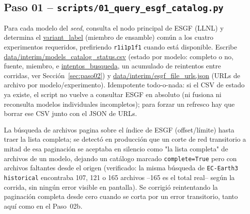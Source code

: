\documentclass[11pt,a4paper]{article}
\newcommand{\archivo}[1]{\begingroup\hypersetup{urlcolor=black}\url{#1}\endgroup}
\begin{document}
\subsection{Paso 01 -- \texttt{scripts/01\_query\_esgf\_catalog.py}}
\label{sec:paso01}
Para cada modelo del \emph{seed}, consulta el nodo principal de ESGF (LLNL) y determina el \archivo{variant_label} (miembro de ensamble) com\'un a los cuatro experimentos requeridos, prefiriendo \texttt{r1i1p1f1} cuando est\'a disponible. Escribe \archivo{data/interim/models_catalog_status.csv} (estado por modelo: completo o no, fuente, miembro, e \archivo{intentos_busqueda}, un acumulado de reintentos entre corridas, ver Secci\'on~\ref{sec:paso02}) y \archivo{data/interim/esgf_file_urls.json} (URLs de archivo por modelo/experimento). Idempotente todo-o-nada: si el CSV de estado ya existe, el script no vuelve a consultar ESGF en absoluto (ni fusiona ni reconsulta modelos individuales incompletos); para forzar un refresco hay que borrar ese CSV junto con el JSON de URLs.

La b\'usqueda de archivos pagina sobre el \'indice de ESGF (offset/l\'imite) hasta traer la lista completa; se detect\'o en producci\'on que un corte de red transitorio a mitad de esa paginaci\'on se aceptaba en silencio como "la lista completa" de archivos de un modelo, dejando un cat\'alogo marcado \texttt{complete=True} pero con archivos faltantes desde el origen (verificado: la misma b\'usqueda de \texttt{EC-Earth3 historical} encontraba 107, 121 o 165 archivos --165 es el total real-- seg\'un la corrida, sin ning\'un error visible en pantalla). Se corrigi\'o reintentando la paginaci\'on completa desde cero cuando se corta por un error transitorio, tanto aqu\'i como en el Paso~02b.
\end{document}
